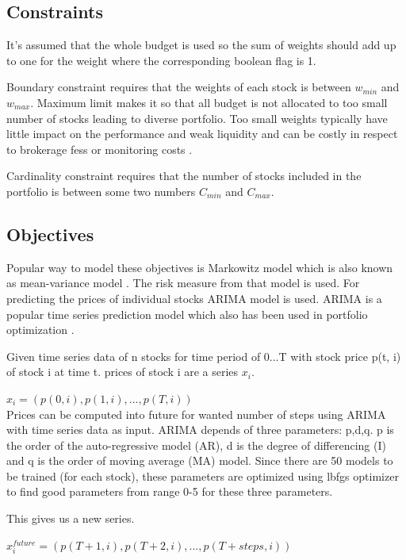 \documentclass[11pt]{article} %
\begin{document}
\subsection{Constraints}

It's assumed that the whole budget is used so the sum of weights should add up to one for the weight where the corresponding boolean flag is 1.

Boundary constraint requires that the weights of each stock is between $w_{min}$ and $w_{max}$. Maximum limit makes it so that all budget is not allocated to too small number of stocks leading to diverse portfolio. Too small weights typically have little impact on the performance and weak liquidity and can be costly in respect to brokerage fess or monitoring costs \cite{ertenlice2018survey}.

Cardinality constraint requires that the number of stocks included in the portfolio is between some two numbers $C_{min}$ and $C_{max}$. 

\subsection{Objectives}

Popular way to model these objectives is Markowitz model which is also known as mean-variance model \cite{kolm201460}. The risk measure from that model is used. For predicting the prices of individual stocks ARIMA model is used. ARIMA is a popular time series prediction model which also has been used in portfolio optimization \cite{kumar2021multi}. 

Given time series data of n stocks for time period of 0...T with stock price p(t, i) of stock i at time t. prices of stock i are a series $x_i$.

$x_i = (p(0, i), p(1, i), ..., p(T, i))$\\

Prices can be computed into future for wanted number of steps using ARIMA with time series data as input. ARIMA depends of three parameters: p,d,q. p is the order of the auto-regressive model (AR), d is the degree of differencing (I) and q is the order of moving average (MA) model. Since there are 50 models to be trained (for each stock), these parameters are optimized using lbfgs optimizer to find good parameters from range 0-5 for these three parameters.

This gives us a new series.

$x_i^{future} = (p(T+1, i), p(T+2, i), ..., p(T+steps, i))$
\end{document}
